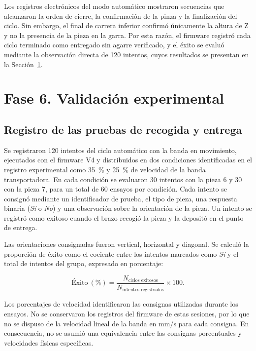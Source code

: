Los registros electrónicos del modo automático mostraron secuencias que alcanzaron la orden de cierre, la confirmación de la pinza y la finalización del ciclo. Sin embargo, el final de carrera inferior confirmó únicamente la altura de Z y no la presencia de la pieza en la garra. Por esta razón, el firmware registró cada ciclo terminado como entregado sin agarre verificado, y el éxito se evaluó mediante la observación directa de 120 intentos, cuyos resultados se presentan en la Sección~\ref{sec:resultados_fase6}.


\section{Fase 6. Validación experimental}
\label{sec:resultados_fase6}

\subsection{Registro de las pruebas de recogida y entrega}

Se registraron 120 intentos del ciclo automático con la banda en movimiento, ejecutados con el firmware V4 y distribuidos en dos condiciones identificadas en el registro experimental como 35~\% y 25~\% de velocidad de la banda transportadora. En cada condición se evaluaron 30 intentos con la pieza 6 y 30 con la pieza 7, para un total de 60 ensayos por condición. Cada intento se consignó mediante un identificador de prueba, el tipo de pieza, una respuesta binaria (\textit{Sí} o \textit{No}) y una observación sobre la orientación de la pieza. Un intento se registró como exitoso cuando el brazo recogió la pieza y la depositó en el punto de entrega.

Las orientaciones consignadas fueron vertical, horizontal y diagonal. Se calculó la proporción de éxito como el cociente entre los intentos marcados como \textit{Sí} y el total de intentos del grupo, expresado en porcentaje:

\begin{equation}
    \text{Éxito}~(\%) = \frac{N_{\text{ciclos exitosos}}}{N_{\text{intentos registrados}}}\times 100.
    \label{eq:fase6_tasa_exito}
\end{equation}

Los porcentajes de velocidad identificaron las consignas utilizadas durante los ensayos. No se conservaron los registros del firmware de estas sesiones, por lo que no se dispuso de la velocidad lineal de la banda en mm/s para cada consigna. En consecuencia, no se asumió una equivalencia entre las consignas porcentuales y velocidades físicas específicas.

